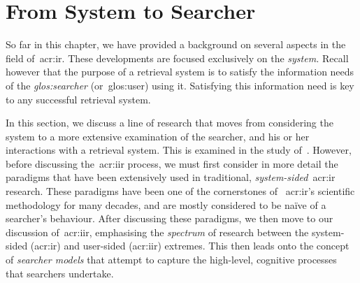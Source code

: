 
\section{From System to Searcher}\label{sec:ir_background:user}
So far in this chapter, we have provided a background on several aspects in the field of~\gls{acr:ir}. These developments are focused exclusively on the \emph{system.} Recall however that the purpose of a retrieval system is to satisfy the information needs of the \emph{\gls{glos:searcher}} (or~\gls{glos:user}) using it. Satisfying this information need is key to any successful retrieval system.

In this section, we discuss a line of research that moves from considering the system to a more extensive examination of the searcher, and his or her interactions with a retrieval system. This is examined in the study of~. However, before discussing the~\gls{acr:iir} process, we must first consider in more detail the paradigms that have been extensively used in traditional, \emph{system-sided}~\gls{acr:ir} research. These paradigms have been one of the cornerstones of ~\gls{acr:ir}'s scientific methodology for many decades, and are mostly considered to be na\"{i}ve of a searcher's behaviour. After discussing these paradigms, we then move to our discussion of~\gls{acr:iir}, emphasising the \emph{spectrum} of research between the system-sided (\gls{acr:ir}) and user-sided (\gls{acr:iir}) extremes. This then leads onto the concept of \emph{searcher models} that attempt to capture the high-level, cognitive processes that searchers undertake.

